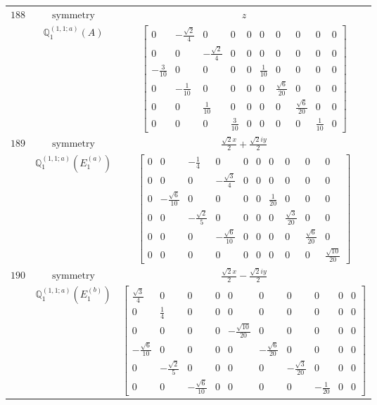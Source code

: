 \documentclass[fleqn,8pt,landscape]{jsarticle}
\begin{document}
\begin{longtable}{ccc}
$ 188 $ & $ \text{symmetry} $ & $ z $ \\
$  $ & $ \mathbb{Q}_{1}^{(1,1;a)}(A) $ & $ \begin{bmatrix} 0 & - \frac{\sqrt{2}}{4} & 0 & 0 & 0 & 0 & 0 & 0 & 0 & 0 \\ 0 & 0 & - \frac{\sqrt{2}}{4} & 0 & 0 & 0 & 0 & 0 & 0 & 0 \\ - \frac{3}{10} & 0 & 0 & 0 & 0 & \frac{1}{10} & 0 & 0 & 0 & 0 \\ 0 & - \frac{1}{10} & 0 & 0 & 0 & 0 & \frac{\sqrt{6}}{20} & 0 & 0 & 0 \\ 0 & 0 & \frac{1}{10} & 0 & 0 & 0 & 0 & \frac{\sqrt{6}}{20} & 0 & 0 \\ 0 & 0 & 0 & \frac{3}{10} & 0 & 0 & 0 & 0 & \frac{1}{10} & 0 \end{bmatrix} $ \\ \hline
$ 189 $ & $ \text{symmetry} $ & $ \frac{\sqrt{2} x}{2} + \frac{\sqrt{2} i y}{2} $ \\
$  $ & $ \mathbb{Q}_{1}^{(1,1;a)}(E_{1}^{(a)}) $ & $ \begin{bmatrix} 0 & 0 & - \frac{1}{4} & 0 & 0 & 0 & 0 & 0 & 0 & 0 \\ 0 & 0 & 0 & - \frac{\sqrt{3}}{4} & 0 & 0 & 0 & 0 & 0 & 0 \\ 0 & - \frac{\sqrt{6}}{10} & 0 & 0 & 0 & 0 & \frac{1}{20} & 0 & 0 & 0 \\ 0 & 0 & - \frac{\sqrt{2}}{5} & 0 & 0 & 0 & 0 & \frac{\sqrt{3}}{20} & 0 & 0 \\ 0 & 0 & 0 & - \frac{\sqrt{6}}{10} & 0 & 0 & 0 & 0 & \frac{\sqrt{6}}{20} & 0 \\ 0 & 0 & 0 & 0 & 0 & 0 & 0 & 0 & 0 & \frac{\sqrt{10}}{20} \end{bmatrix} $ \\ \hline
$ 190 $ & $ \text{symmetry} $ & $ \frac{\sqrt{2} x}{2} - \frac{\sqrt{2} i y}{2} $ \\
$  $ & $ \mathbb{Q}_{1}^{(1,1;a)}(E_{1}^{(b)}) $ & $ \begin{bmatrix} \frac{\sqrt{3}}{4} & 0 & 0 & 0 & 0 & 0 & 0 & 0 & 0 & 0 \\ 0 & \frac{1}{4} & 0 & 0 & 0 & 0 & 0 & 0 & 0 & 0 \\ 0 & 0 & 0 & 0 & - \frac{\sqrt{10}}{20} & 0 & 0 & 0 & 0 & 0 \\ - \frac{\sqrt{6}}{10} & 0 & 0 & 0 & 0 & - \frac{\sqrt{6}}{20} & 0 & 0 & 0 & 0 \\ 0 & - \frac{\sqrt{2}}{5} & 0 & 0 & 0 & 0 & - \frac{\sqrt{3}}{20} & 0 & 0 & 0 \\ 0 & 0 & - \frac{\sqrt{6}}{10} & 0 & 0 & 0 & 0 & - \frac{1}{20} & 0 & 0 \end{bmatrix} $ \\ \hline

\end{longtable}
\end{document}
